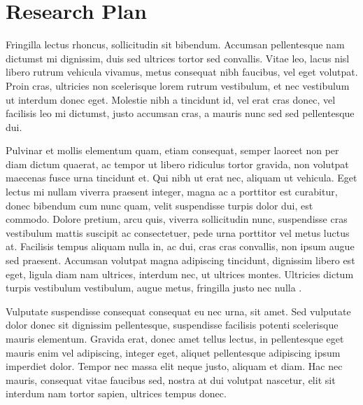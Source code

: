 
\section*{Research Plan}
\begin{singlespace}
\im
Fringilla lectus rhoncus, sollicitudin sit bibendum.
Accumsan pellentesque nam dictumst mi dignissim, duis sed ultrices tortor sed convallis.
Vitae leo, lacus nisl libero rutrum vehicula vivamus, metus consequat nibh faucibus, vel eget volutpat.
Proin cras, ultricies non scelerisque lorem rutrum vestibulum, et nec vestibulum ut interdum donec eget.
Molestie nibh a tincidunt id, vel erat cras donec, vel facilisis leo mi dictumst, justo accumsan cras, a mauris nunc sed sed pellentesque dui.
\end{singlespace}

\begin{singlespace}
\bi
Pulvinar et mollis elementum quam, etiam consequat, semper laoreet non per diam dictum quaerat, ac tempor ut libero ridiculus tortor gravida, non volutpat maecenas fusce urna tincidunt et.
Qui nibh ut erat nec, aliquam ut vehicula.
Eget lectus mi nullam viverra praesent integer, magna ac a porttitor est curabitur, donec bibendum cum nunc quam, velit suspendisse turpis dolor dui, est commodo.
Dolore pretium, arcu quis, viverra sollicitudin nunc, suspendisse cras vestibulum mattis suscipit ac consectetuer, pede urna porttitor vel metus luctus at.
Facilisis tempus aliquam nulla in, ac dui, cras cras convallis, non ipsum augue sed praesent.
Accumsan volutpat magna adipiscing tincidunt, dignissim libero est eget, ligula diam nam ultrices, interdum nec, ut ultrices montes.
Ultricies dictum turpis vestibulum vestibulum, augue metus, fringilla justo nec nulla \cite{metropolis1953}.
\end{singlespace}

\begin{singlespace}
\im
Vulputate suspendisse consequat consequat eu nec urna, sit amet.
Sed vulputate dolor donec sit dignissim pellentesque, suspendisse facilisis potenti scelerisque mauris elementum.
Gravida erat, donec amet tellus lectus, in pellentesque eget mauris enim vel adipiscing, integer eget, aliquet pellentesque adipiscing ipsum imperdiet dolor.
Tempor nec massa elit neque justo, aliquam et diam.
Hac nec mauris, consequat vitae faucibus sed, nostra at dui volutpat nascetur, elit sit interdum nam tortor sapien, ultrices tempus donec.
\end{singlespace}

